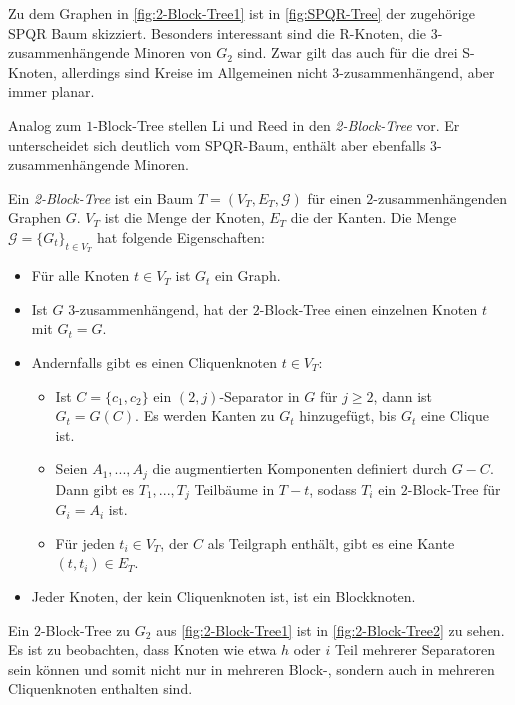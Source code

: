 Zu dem Graphen in \Abb \ref{fig:2-Block-Tree1} ist in \Abb \ref{fig:SPQR-Tree} der zugehörige SPQR Baum skizziert.
Besonders interessant sind die R-Knoten, die $3$-zusammenhängende Minoren von $G_2$ sind.
Zwar gilt das auch für die drei S-Knoten, allerdings sind Kreise im Allgemeinen nicht $3$-zusammenhängend, aber immer planar.

Analog zum $1$-Block-Tree stellen Li und Reed in \cite{ReL08} den \emph{2-Block-Tree} vor.
Er unterscheidet sich deutlich vom SPQR-Baum, enthält aber ebenfalls $3$-zusammenhängende Minoren.

\begin{definition}
Ein \emph{2-Block-Tree} ist ein Baum $T = (V_T, E_T, \mathcal{G})$ für einen $2$-zusammenhängenden Graphen $G$.
$V_T$ ist die Menge der Knoten, $E_T$ die der Kanten.
Die Menge $\mathcal{G} = \{G_t\}_{t \in V_T}$ hat folgende Eigenschaften:
\begin{itemize}
  \item Für alle Knoten $t \in V_T$ ist $G_t$ ein Graph.
  \item Ist $G$ $3$-zusammenhängend, hat der $2$-Block-Tree einen einzelnen Knoten $t$ mit $G_t = G$.
  \item Andernfalls gibt es einen Cliquenknoten $t \in V_T$:
  \begin{itemize}
    \item Ist $C = \{c_1, c_2\}$ ein $(2, j)$-Separator in $G$ für $j \geq 2$, dann ist $G_t = G(C)$.
          Es werden Kanten zu $G_t$ hinzugefügt, bis $G_t$ eine Clique ist.
    \item Seien $A_1, ..., A_j$ die augmentierten Komponenten definiert durch $G - C$.
          Dann gibt es $T_1, ..., T_j$ Teilbäume in $T - t$, sodass $T_i$ ein $2$-Block-Tree für $G_i = A_i$ ist.
    \item Für jeden $t_i \in V_T$, der $C$ als Teilgraph enthält, gibt es eine Kante $(t, t_i) \in E_T$.
  \end{itemize}
  \item Jeder Knoten, der kein Cliquenknoten ist, ist ein Blockknoten.
\end{itemize}
\end{definition}

Ein $2$-Block-Tree zu $G_2$ aus \Abb \ref{fig:2-Block-Tree1} ist in \Abb \ref{fig:2-Block-Tree2} zu sehen.
Es ist zu beobachten, dass Knoten wie etwa $h$ oder $i$ Teil mehrerer Separatoren sein können und somit nicht nur in mehreren Block-, sondern auch in mehreren Cliquenknoten enthalten sind.

